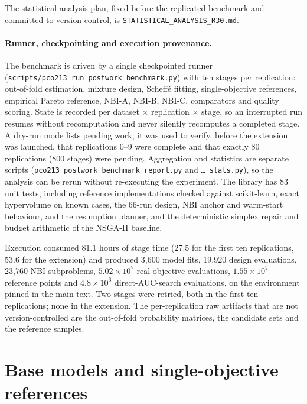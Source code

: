 \documentclass[11pt,a4paper]{article}
\begin{document}
The statistical analysis plan, fixed before the replicated benchmark and committed to version control, is
\texttt{STATISTICAL\_ANALYSIS\_R30.md}.

\paragraph{Runner, checkpointing and execution provenance.}
The benchmark is driven by a single checkpointed runner
(\texttt{scripts/\allowbreak pco213\_\allowbreak run\_\allowbreak postwork\_\allowbreak benchmark.py}) with ten
stages per replication: out-of-fold estimation, mixture design, Scheff\'e fitting, single-objective references,
empirical Pareto reference, NBI-A, NBI-B, NBI-C, comparators and quality scoring. State is recorded per dataset
$\times$ replication $\times$ stage, so an interrupted run resumes without recomputation and never silently
recomputes a completed stage. A dry-run mode lists pending work; it was used to verify, before the extension was
launched, that replications 0--9 were complete and that exactly 80 replications (800 stages) were pending.
Aggregation and statistics are separate scripts
(\texttt{pco213\_\allowbreak postwork\_\allowbreak benchmark\_\allowbreak report.py} and
\texttt{\ldots\_\allowbreak stats.py}), so the analysis can be rerun without re-executing the experiment. The
library has 83 unit tests, including reference implementations checked against scikit-learn, exact hypervolume on
known cases, the 66-run design, NBI anchor and warm-start behaviour, and the resumption planner, and the deterministic simplex repair and budget arithmetic of the NSGA-II baseline.

Execution consumed 81.1 hours of stage time (27.5 for the first ten replications, 53.6 for the extension) and
produced 3{,}600 model fits, 19{,}920 design evaluations, 23{,}760 NBI subproblems, $5.02\times10^{7}$ real
objective evaluations, $1.55\times10^{7}$ reference points and $4.8\times10^{6}$ direct-AUC-search evaluations, on
the environment pinned in the main text. Two stages were retried, both in the first ten replications; none in the
extension. The per-replication raw artifacts that are not version-controlled are the out-of-fold probability
matrices, the candidate sets and the reference samples.

\section{Base models and single-objective references}
\label{sec:s2}



\end{document}
